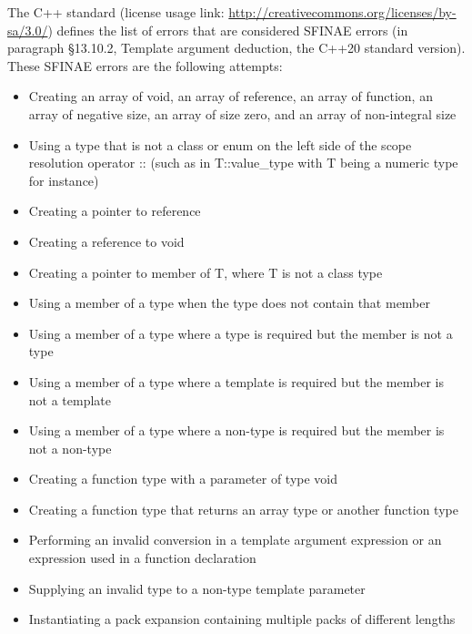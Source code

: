 The C++ standard (license usage link: \url{http://creativecommons.org/licenses/by-sa/3.0/}) defines the list of errors that are considered SFINAE errors (in paragraph §13.10.2, Template argument deduction, the C++20 standard version). These SFINAE errors are the following attempts:


\begin{itemize}
\item
Creating an array of void, an array of reference, an array of function, an array of negative size, an array of size zero, and an array of non-integral size

\item
Using a type that is not a class or enum on the left side of the scope resolution operator :: (such as in T::value\_type with T being a numeric type for instance)

\item
Creating a pointer to reference

\item
Creating a reference to void

\item
Creating a pointer to member of T, where T is not a class type

\item
Using a member of a type when the type does not contain that member

\item
Using a member of a type where a type is required but the member is not a type

\item
Using a member of a type where a template is required but the member is not a template

\item
Using a member of a type where a non-type is required but the member is not a non-type

\item
Creating a function type with a parameter of type void

\item
Creating a function type that returns an array type or another function type

\item
Performing an invalid conversion in a template argument expression or an expression used in a function declaration

\item
Supplying an invalid type to a non-type template parameter

\item
Instantiating a pack expansion containing multiple packs of different lengths
\end{itemize}

